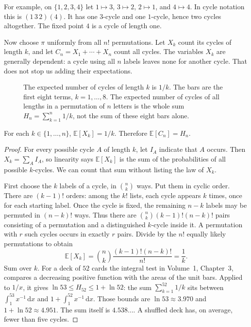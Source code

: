 For example, on $\{1,2,3,4\}$ let $1\mapsto3$, $3\mapsto2$, $2\mapsto1$, and $4\mapsto4$. In cycle notation this is $(1\,3\,2)(4)$. It has one $3$-cycle and one $1$-cycle, hence two cycles altogether. The fixed point $4$ is a cycle of length one.

Now choose $\pi$ uniformly from all $n!$ permutations. Let $X_k$ count its cycles of length $k$, and let $C_n=X_1+\cdots+X_n$ count all cycles. The variables $X_k$ are generally dependent: a cycle using all $n$ labels leaves none for another cycle. That does not stop us adding their expectations.

\begin{figure}[ht]
\centering
{}
\caption{The expected number of cycles of length $k$ is $1/k$. The bars are the first eight terms, $k=1,\ldots,8$. The expected number of cycles of all lengths in a permutation of $n$ letters is the whole sum $H_n=\sum_{k=1}^n 1/k$, not the sum of these eight bars alone.}
\label{fig:cycles}
\end{figure}

\begin{proposition}\label{prop:cycles}
For each $k\in\{1,\ldots,n\}$, $\mathbb E[X_k]=1/k$. Therefore $\mathbb E[C_n]=H_n$.
\end{proposition}
\begin{proof}
For every possible cycle $A$ of length $k$, let $I_A$ indicate that $A$ occurs. Then $X_k=\sum_A I_A$, so linearity says $\mathbb E[X_k]$ is the sum of the probabilities of all possible $k$-cycles. We can count that sum without listing the law of $X_k$.

First choose the $k$ labels of a cycle, in $\binom nk$ ways. Put them in cyclic order. There are $(k-1)!$ orders: among the $k!$ lists, each cycle appears $k$ times, once for each starting label. Once the cycle is fixed, the remaining $n-k$ labels may be permuted in $(n-k)!$ ways. Thus there are $\binom nk(k-1)!(n-k)!$ pairs consisting of a permutation and a distinguished $k$-cycle inside it. A permutation with $r$ such cycles occurs in exactly $r$ pairs. Divide by the $n!$ equally likely permutations to obtain
\[
 \mathbb E[X_k]=\binom{n}{k}\frac{(k-1)!(n-k)!}{n!}=\frac1k.
\]
Sum over $k$. For a deck of $52$ cards the integral test in Volume~1, Chapter~3, compares a decreasing positive function with the areas of the unit bars. Applied to $1/x$, it gives $\ln53\le H_{52}\le1+\ln52$: the sum $\sum_{k=1}^{52}1/k$ sits between $\int_1^{53}x^{-1}\,\mathrm dx$ and $1+\int_1^{52}x^{-1}\,\mathrm dx$. Those bounds are $\ln53\approx3.970$ and $1+\ln52\approx4.951$. The sum itself is $4.538\ldots$. A shuffled deck has, on average, fewer than five cycles.
\end{proof}

